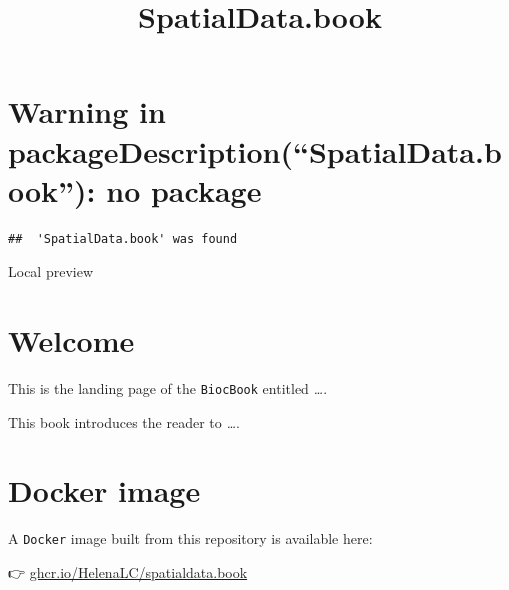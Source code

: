 \documentclass[
  letterpaper,
  DIV=11,
  numbers=noendperiod]{scrreprt}
\title{SpatialData.book}
\author{}
\date{}
\renewcommand*\contentsname{Table of contents}
\newcommand\contentsname{Table of contents}
\begin{document}
\maketitle

\renewcommand*\contentsname{Table of contents}
{
\hypersetup{linkcolor=}
\setcounter{tocdepth}{2}
\tableofcontents
}


\chapter*{Warning in packageDescription(``SpatialData.book''): no
package}\label{warning-in-packagedescriptionspatialdata.book-no-package}


\begin{verbatim}
##  'SpatialData.book' was found
\end{verbatim}

Local preview


\chapter*{Welcome}\label{welcome}


This is the landing page of the \texttt{BiocBook} entitled
\emph{\ldots{}}.

This book introduces the reader to \emph{\ldots{}}.


\chapter*{Docker image}\label{docker-image}


A \texttt{Docker} image built from this repository is available here:

👉
\href{https://ghcr.io/HelenaLC/spatialdata.book}{ghcr.io/HelenaLC/spatialdata.book}
🐳
\end{document}
